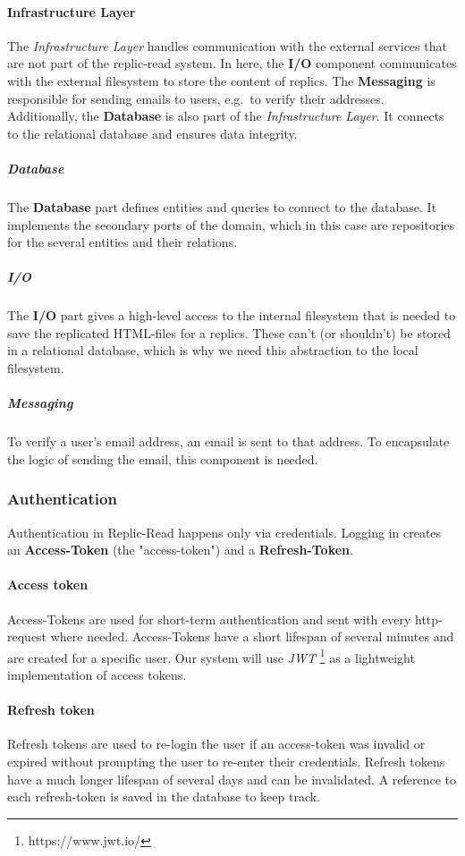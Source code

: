 \paragraph{Infrastructure Layer}
The \textit{Infrastructure Layer} handles communication with the external services that are not part of the replic-read system.
In here, the \textbf{I/O} component communicates with the external filesystem to store the content of replics.
The \textbf{Messaging} is responsible for sending emails to users, e.g.\ to verify their addresses.
Additionally, the \textbf{Database} is also part of the \textit{Infrastructure Layer}.
It connects to the relational database and ensures data integrity.

\subparagraph{Database}
The \textbf{Database} part defines entities and queries to connect to the database.
It implements the secondary ports of the domain, which in this case are repositories for the several entities and their relations.

\subparagraph{I/O}
The \textbf{I/O} part gives a high-level access to the internal filesystem that is needed to save the replicated HTML-files for a replics.
These can't (or shouldn't) be stored in a relational database, which is why we need this abstraction to the local filesystem.

\subparagraph{Messaging}
To verify a user's email address, an email is sent to that address.
To encapsulate the logic of sending the email, this component is needed.

\subsubsection{Authentication}
Authentication in Replic-Read happens only via credentials.
Logging in creates an \textbf{Access-Token} (the "access-token") and a \textbf{Refresh-Token}.

\paragraph{Access token}
Access-Tokens are used for short-term authentication and sent with every http-request where needed.
Access-Tokens have a short lifespan of several minutes and are created for a specific user.
\newline
Our system will use \textit{JWT} \footnote{https://www.jwt.io/} as a lightweight implementation of access tokens.

\paragraph{Refresh token}
Refresh tokens are used to re-login the user if an access-token was invalid or expired without prompting the user to re-enter their credentials.
Refresh tokens have a much longer lifespan of several days and can be invalidated.
A reference to each refresh-token is saved in the database to keep track.

